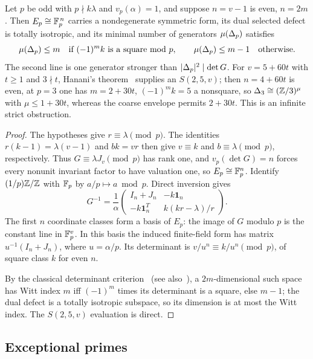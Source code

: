 \begin{theorem}\label{thm:wi}
Let $p$ be odd with $p\nmid k\lambda$ and $v_p(\alpha)=1$, and suppose $n=v-1$ is
even, $n=2m$. Then $E_p\cong\mathbb{F}_p^{\,n}$ carries a nondegenerate symmetric form,
its dual selected defect is totally isotropic, and its minimal number of
generators $\mu(\Delta_p)$ satisfies
\[
\mu(\Delta_p)\le m\quad\text{if }(-1)^m k\text{ is a square mod }p,\qquad
\mu(\Delta_p)\le m-1\quad\text{otherwise.}
\]
The second line is one generator stronger than $|\Delta_p|^{2}\mid\det G$. For
$v=5+60t$ with $t\ge1$ and $3\nmid t$, Hanani's theorem~\cite{Hanani1972}
supplies an $S(2,5,v)$; then $n=4+60t$ is even, at $p=3$ one has $m=2+30t$,
$(-1)^m k=5$ a nonsquare, so $\Delta_3\cong(\mathbb{Z}/3)^{\mu}$ with $\mu\le 1+30t$,
whereas the coarse envelope permits $2+30t$. This is an infinite strict
obstruction.
\end{theorem}

\begin{proof}
The hypotheses give $r\equiv\lambda\pmod p$. The identities
$r(k-1)=\lambda(v-1)$ and $bk=vr$ then give $v\equiv k$ and
$b\equiv\lambda\pmod p$, respectively. Thus $G\equiv\lambda J_v\pmod p$ has rank one, and
$v_p(\det G)=n$ forces every nonunit invariant factor to have valuation one, so
$E_p\cong\mathbb{F}_p^{n}$. Identify $(1/p)\mathbb{Z}/\mathbb{Z}$ with $\mathbb{F}_p$ by
$a/p\mapsto a\bmod p$. Direct inversion gives
\[
G^{-1}=\frac1\alpha
\begin{pmatrix}I_n+J_n&-k\mathbf1_n\\
-k\mathbf1_n^T&k(kr-\lambda)/r\end{pmatrix}.
\]
The first $n$ coordinate classes form a basis of $E_p$: the image of $G$
modulo $p$ is the constant line in $\mathbb{F}_p^v$. In this basis the induced
finite-field form has matrix $u^{-1}(I_n+J_n)$, where $u=\alpha/p$.
Its determinant is $v/u^n\equiv k/u^n\pmod p$, of square class $k$ for even $n$.

By the classical determinant criterion~\cite[Theorem 5.2]{WilsonNotes}
(see also~\cite{Schmidt}), a
$2m$-dimensional such space has Witt index $m$ iff $(-1)^m$ times its determinant
is a square, else $m-1$; the dual defect is a totally isotropic subspace, so its
dimension is at most the Witt index. The $S(2,5,v)$ evaluation is direct.
\end{proof}

\subsection{Exceptional primes}

